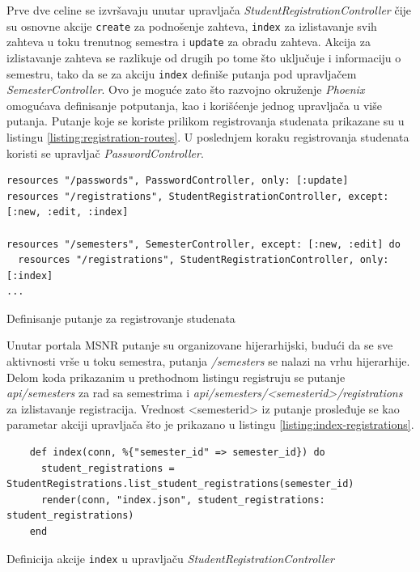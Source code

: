 \documentclass[12pt,oneside]{memoir}
\begin{document}
Prve dve celine se izvršavaju unutar upravljača \emph{StudentRegistrationController} čije su
osnovne akcije \texttt{create} za podnošenje zahteva, \texttt{index} za izlistavanje svih zahteva u toku
trenutnog semestra i \texttt{update} za obradu zahteva. Akcija za izlistavanje zahteva se razlikuje od drugih
po tome što uključuje i informaciju o semestru, tako da se za akciju \texttt{index} definiše putanja pod upravljačem
\emph{SemesterController}. Ovo je moguće zato što razvojno okruženje \emph{Phoenix} omogućava definisanje potputanja, kao i korišćenje jednog upravljača u više putanja.
Putanje koje se koriste prilikom registrovanja studenata prikazane su u listingu \ref{listing:registration-routes}.
U poslednjem koraku registrovanja studenata koristi se upravljač \emph{PasswordController}.
\begin{listing}[h]
\begin{verbatim}
resources "/passwords", PasswordController, only: [:update]
resources "/registrations", StudentRegistrationController, except: [:new, :edit, :index]

resources "/semesters", SemesterController, except: [:new, :edit] do
  resources "/registrations", StudentRegistrationController, only: [:index]
... 
\end{verbatim}
\caption{Definisanje putanje za registrovanje studenata}
\label{listing:registration-routes}
\end{listing}

Unutar portala MSNR putanje su organizovane hijerarhijski, budući da se sve aktivnosti vrše u toku semestra,
putanja \emph{/semesters} se nalazi na vrhu hijerarhije. Delom koda prikazanim u prethodnom listingu registruju
se putanje \emph{api/semesters} za rad sa semestrima i \emph{api/semesters/<semester{\textunderscore}id>/registrations}
za izlistavanje registracija. Vrednost <semester{\textunderscore}id> iz putanje prosleđuje se kao parametar akciji
upravljača što je prikazano u listingu \ref{listing:index-registrations}.
\begin{listing}[h]
  \begin{verbatim}
    def index(conn, %{"semester_id" => semester_id}) do
      student_registrations = StudentRegistrations.list_student_registrations(semester_id)
      render(conn, "index.json", student_registrations: student_registrations)
    end
  \end{verbatim}
\caption{Definicija akcije \texttt{index} u upravljaču \emph{StudentRegistrationController}}
\label{listing:index-registrations}
\end{listing}
\end{document}
